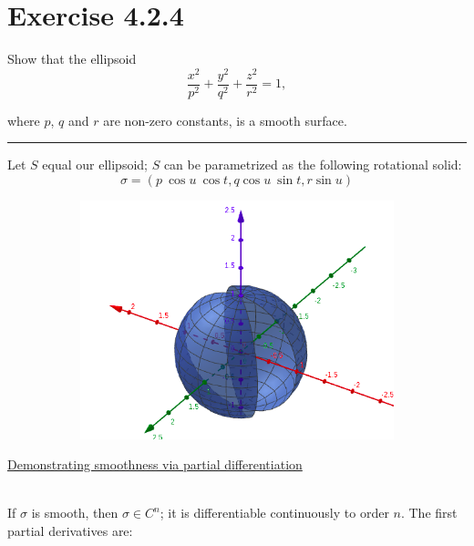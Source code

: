 \documentclass[12pt]{article}
\newcommand{\ulind}[1]
{
\noindent
\underline{#1}\\\\
\indent
}
\begin{document}
\maketitle

\section*{Exercise 4.2.4}
Show that the ellipsoid
$$
\frac{x^2}{p^2} + \frac{y^2}{q^2} + \frac{z^2}{r^2} = 1,
$$

where $p$, $q$ and $r$ are non-zero constants, is a smooth surface.

\vspace{1cm}
\hrule
\vspace{1cm}
\noindent

Let $S$ equal our ellipsoid; $S$ can be parametrized as the following rotational solid:
$$
\sigma = (p \ \cos u \ \cos t, q \cos u \ \sin t, r \sin u)
$$

\begin{figure}[h!]
	\centering
	\begin{subfigure}[b]{0.5\linewidth}
		\includegraphics[width=\linewidth]{./assets/4-2-4/sphere-rotational.png}
	\end{subfigure}
\end{figure}
\indent

\clearpage

\ulind{Demonstrating smoothness via partial differentiation}
If $\sigma$ is smooth, then $\sigma \in C^n$; it is differentiable continuously to order $n$. The first partial derivatives are:
\end{document}
